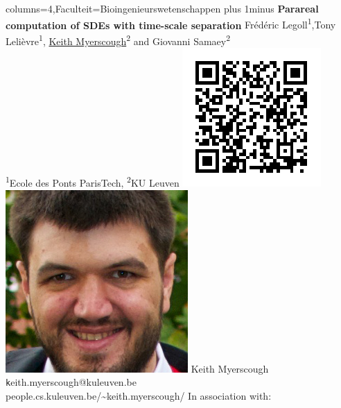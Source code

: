 \documentclass[landscape,a0paper,fontscale=0.45]{kuleuvenposter}
\begin{document}
\begin{poster}{columns=4,Faculteit=Bioingenieurswetenschappen}%
{ %
\font plus 1\font minus \font %
  \Huge\bfseries Parareal computation of SDEs with time-scale separation
}
{ %
  Fr\'ed\'eric Legoll\textsuperscript{1},Tony Leli\`evre\textsuperscript{1}, \underline{Keith Myerscough}\textsuperscript{2} and Giovanni Samaey\textsuperscript{2}\\
  {\footnotesize \textsuperscript{1}Ecole des Ponts ParisTech, \textsuperscript{2}KU Leuven}}
{ %
  \includegraphics[width=\footerheight]{specific/qrcode}%
  \includegraphics[width=\footerheight]{specific/photo.jpg}
}
{ %
  Keith Myerscough\\{\texttt keith.myerscough@kuleuven.be}\\people.cs.kuleuven.be/\~{}keith.myerscough/
}
{%
In association with:%
}
{%
}
\end{poster}
\end{document}
